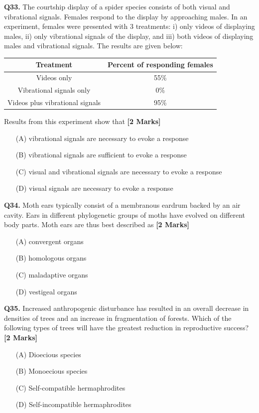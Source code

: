 \documentclass[11pt]{article}
\newcommand{\questionb}[2]{
    \noindent\textbf{Q#2.} #1 \hfill \textbf{[2 Marks]}
}
\begin{document}
\questionb{The courtship display of a spider species consists of both visual and vibrational signals. Females respond to the display by approaching males. In an experiment, females were presented with 3 treatments: i) only videos of displaying males, ii) only vibrational signals of the display, and iii) both videos of displaying males and vibrational signals. The results are given below:

\begin{center}
\begin{tabular}{|c|c|}
\hline
\textbf{Treatment} & \textbf{Percent of responding females} \\
\hline
Videos only & 55\% \\
Vibrational signals only & 0\% \\
Videos plus vibrational signals & 95\% \\
\hline
\end{tabular}
\end{center}

Results from this experiment show that}{33}
\begin{enumerate}
    \item[(A)] vibrational signals are necessary to evoke a response
    \item[(B)] vibrational signals are sufficient to evoke a response
    \item[(C)] visual and vibrational signals are necessary to evoke a response
    \item[(D)] visual signals are necessary to evoke a response
\end{enumerate}
\vspace{0.5cm}

\questionb{Moth ears typically consist of a membranous eardrum backed by an air cavity. Ears in different phylogenetic groups of moths have evolved on different body parts. Moth ears are thus best described as}{34}
\begin{enumerate}
    \item[(A)] convergent organs
    \item[(B)] homologous organs
    \item[(C)] maladaptive organs
    \item[(D)] vestigeal organs
\end{enumerate}
\vspace{0.5cm}

\questionb{Increased anthropogenic disturbance has resulted in an overall decrease in densities of trees and an increase in fragmentation of forests. Which of the following types of trees will have the greatest reduction in reproductive success?}{35}
\begin{enumerate}
    \item[(A)] Dioecious species
    \item[(B)] Monoecious species
    \item[(C)] Self-compatible hermaphrodites
    \item[(D)] Self-incompatible hermaphrodites
\end{enumerate}
\vspace{0.5cm}
\end{document}
